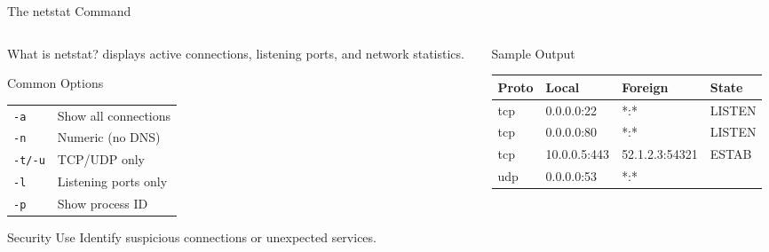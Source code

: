 \documentclass[aspectratio=169]{beamer}  %
\begin{document}
\begin{frame}{The netstat Command}
    \begin{columns}[T]
        \begin{column}{0.48\textwidth}
            \begin{block}{What is netstat?}
                \small
                 displays active connections, listening ports, and network statistics.
            \end{block}
            
            \vspace{0.2em}
            \begin{block}{Common Options}
                \footnotesize
                \begin{tabular}{l l}
                    \texttt{-a} & Show all connections \\
                    \texttt{-n} & Numeric (no DNS) \\
                    \texttt{-t/-u} & TCP/UDP only \\
                    \texttt{-l} & Listening ports only \\
                    \texttt{-p} & Show process ID \\
                \end{tabular}
            \end{block}
            
            \vspace{0.2em}
            \begin{alertblock}{Security Use}
                \small
                Identify suspicious connections or unexpected services.
            \end{alertblock}
        \end{column}
        \begin{column}{0.48\textwidth}
            \begin{block}{Sample Output}
                \ttfamily\tiny
                \begin{tabular}{l l l l}
                    Proto & Local & Foreign & State \\
                    \hline
                    tcp & 0.0.0.0:22 & *:* & LISTEN \\
                    tcp & 0.0.0.0:80 & *:* & LISTEN \\
                    tcp & 10.0.0.5:443 & 52.1.2.3:54321 & ESTAB \\
                    udp & 0.0.0.0:53 & *:* & \\
                \end{tabular}
            \end{block}
            

\end{column}
\end{columns}
\end{frame}
\end{document}
